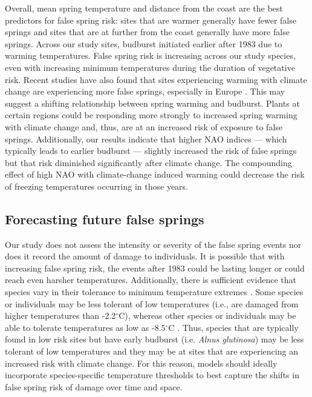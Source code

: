 \documentclass{article}\usepackage[]{graphicx}\usepackage[]{color}
\begin{document}
Overall, mean spring temperature and distance from the coast are the best predictors for false spring risk: sites that are warmer generally have fewer false springs and sites that are at further from the coast generally have more false springs. Across our study sites, budburst initiated earlier after 1983 due to warming temperatures. False spring risk is increasing across our study species, even with increasing minimum temperatures during the duration of vegetative risk. Recent studies have also found that sites experiencing warming with climate change are experiencing more false springs, especially in Europe \citep{Liu2018}. This may suggest a shifting relationship between spring warming and budburst. Plants at certain regions could be responding more strongly to increased spring warming with climate change and, thus, are at an increased risk of exposure to false springs. Additionally, our results indicate that higher NAO indices --- which typically leads to earlier budburst --- slightly increased the risk of false springs but that risk diminished significantly after climate change. The compounding effect of high NAO with climate-change induced warming could decrease the risk of freezing temperatures occurring in those years.%

\subsection*{Forecasting future false springs}
Our study does not assess the intensity or severity of the false spring events nor does it record the amount of damage to individuals. It is possible that with increasing false spring risk, the events after 1983 could be lasting longer or could reach even harsher temperatures. Additionally, there is sufficient evidence that species vary in their tolerance to minimum temperature extremes \citep{Korner2016, Lenz2013, Zhuo2018,bennett2018globtherm}. Some species or individuals may be less tolerant of low temperatures (i.e., are damaged from higher temperatures than -2.2$^{\circ}$C), whereas other species or individuals may be able to tolerate temperatures as low as -8.5$^{\circ}$C \citep{Lenz2016}. Thus, species that are typically found in low risk sites but have early budburst (i.e. \textit{Alnus glutinosa}) may be less tolerant of low temperatures and they may be at sites that are experiencing an increased risk with climate change. For this reason, models should ideally incorporate species-specific temperature thresholds to best capture the shifts in false spring risk of damage over time and space. %
\end{document}
